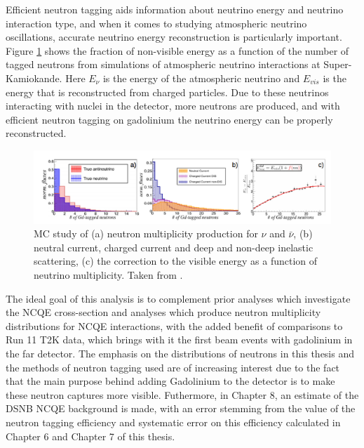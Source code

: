 Efficient neutron tagging aids information about neutrino energy and neutrino interaction type, and when it comes to studying atmospheric neutrino oscillations, accurate neutrino energy reconstruction is particularly important. Figure \ref{fig:atm_nu_energy} shows the fraction of non-visible energy as a function of the number of tagged neutrons from simulations of atmospheric neutrino interactions at Super-Kamiokande. Here $E_{\nu}$ is the energy of the atmospheric neutrino and $E_{vis}$ is the energy that is reconstructed from charged particles. Due to these neutrinos interacting with nuclei in the detector, more neutrons are produced, and with efficient neutron tagging on gadolinium the neutrino energy can be properly reconstructed. 

\begin{figure}
    \includegraphics[width=\textwidth]{Figures/atm_recon_energy.png}
\caption{MC study of (a) neutron multiplicity production for $\nu$ and ${\bar{\nu}}$, (b) neutral current, charged current and deep and non-deep inelastic scattering, (c) the correction to the visible energy as a function of neutrino multiplicity. Taken from \cite{marti_evaluation_2020}.}
\label{fig:atm_nu_energy}
\end{figure}



The ideal goal of this analysis is to complement prior analyses which investigate the NCQE cross-section and analyses which produce neutron multiplicity distributions for NCQE interactions, with the added benefit of comparisons to Run 11 T2K data, which brings with it the first beam events with gadolinium in the far detector. The emphasis on the distributions of neutrons in this thesis and the methods of neutron tagging used are of increasing interest due to the fact that the main purpose behind adding Gadolinium to the detector is to make these neutron captures more visible. Futhermore, in Chapter 8, an estimate of the DSNB NCQE background is made, with an error stemming from the value of the neutron tagging efficiency and systematic error on this efficiency calculated in Chapter 6 and Chapter 7 of this thesis.


